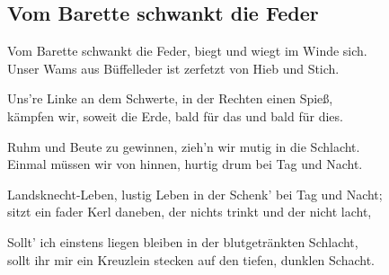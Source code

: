 
\subsection*{Vom Barette schwankt die Feder}
%

\thestrophe Vom Barette schwankt die Feder, biegt und wiegt im Winde sich. \\
Unser Wams aus Büffelleder ist zerfetzt von Hieb und Stich. \\

\thestrophe Uns're Linke an dem Schwerte, in der Rechten einen Spieß, \\
kämpfen wir, soweit die Erde, bald für das und bald für dies. \\

\thestrophe Ruhm und Beute zu gewinnen, zieh'n wir mutig in die Schlacht. \\
Einmal müssen wir von hinnen, hurtig drum bei Tag und Nacht. \\

\thestrophe Landsknecht-Leben, lustig Leben in der Schenk' bei Tag und Nacht; \\
sitzt ein fader Kerl daneben, der nichts trinkt und der nicht lacht, \\

\thestrophe Sollt' ich einstens liegen bleiben in der blutgetränkten Schlacht, \\
sollt ihr mir ein Kreuzlein stecken auf den tiefen, dunklen Schacht. \\
